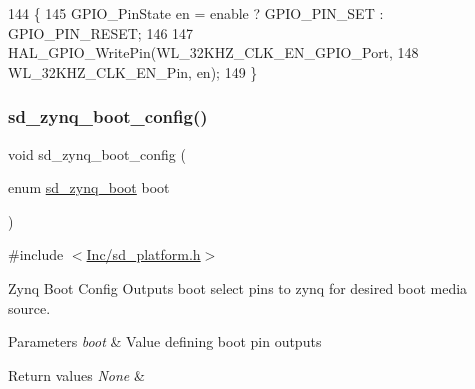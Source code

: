 \begin{DoxyCode}
144 \{
145     GPIO\_PinState en = enable ? GPIO\_PIN\_SET : GPIO\_PIN\_RESET;
146 
147     HAL\_GPIO\_WritePin(WL\_32KHZ\_CLK\_EN\_GPIO\_Port, 
148               WL\_32KHZ\_CLK\_EN\_Pin, en);
149 \}
\end{DoxyCode}
\mbox{\label{group___s_d___platform___function___declarations_ga759f86160fc8d270309fc2a74e4139e3}} 
\subsubsection{\texorpdfstring{sd\+\_\+zynq\+\_\+boot\+\_\+config()}{sd\_zynq\_boot\_config()}}
{\footnotesize\ttfamily void sd\+\_\+zynq\+\_\+boot\+\_\+config (\begin{DoxyParamCaption}\item[{enum \mbox{\hyperlink{group___s_d___platform_ga06667de95c86bfcdef8bcc8ab13cb2d4}{sd\+\_\+zynq\+\_\+boot}}}]{boot }\end{DoxyParamCaption})}



{\ttfamily \#include $<$\mbox{\hyperlink{sd__platform_8h}{Inc/sd\+\_\+platform.\+h}}$>$}



Zynq Boot Config Outputs boot select pins to zynq for desired boot media source. 


\begin{DoxyParams}{Parameters}
{\em boot} & Value defining boot pin outputs \\
\hline
\end{DoxyParams}

\begin{DoxyRetVals}{Return values}
{\em None} & \\
\hline
\end{DoxyRetVals}

